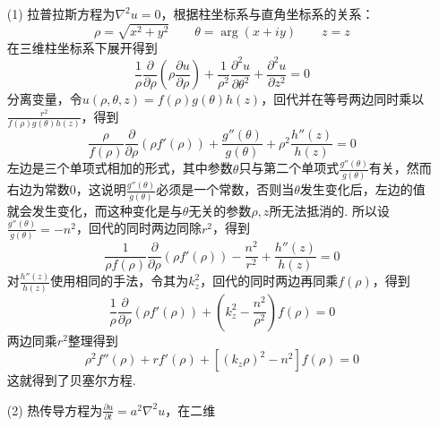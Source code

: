\documentclass[UTF8]{ctexart}
\begin{document}
\begin{itemize}
    \item[(1)] 拉普拉斯方程为\(\nabla^2 u =0\)，根据柱坐标系与直角坐标系的关系：
    \[\rho = \sqrt{x^2+y^2} \qquad \theta = \arg(x+iy) \qquad z = z\]
    在三维柱坐标系下展开得到
    \[\frac{1}{\rho}\frac{\partial}{\partial \rho}\left(\rho\frac{\partial u}{\partial \rho}\right) + \frac{1}{\rho^2}\frac{\partial^2 u}{\partial \theta^2} + \frac{\partial^2 u}{\partial z^2} = 0\]
    分离变量，令\(u(\rho,\theta,z)=f(\rho)g(\theta)h(z)\)，回代并在等号两边同时乘以\(\displaystyle{\frac{r^2}{f(\rho)g(\theta)h(z)}}\)，得到
    \[\frac{\rho}{f(\rho)}\frac{\partial}{\partial \rho}\left(\rho f'(\rho)\right) + \frac{g''(\theta)}{g(\theta)} + \rho^2\frac{h''(z)}{h(z)} = 0\]
    左边是三个单项式相加的形式，其中参数\(\theta\)只与第二个单项式\(\displaystyle{\frac{g''(\theta)}{g(\theta)}}\)有关，然而右边为常数\(0\)，这说明\(\displaystyle{\frac{g''(\theta)}{g(\theta)}}\)必须是一个常数，否则当\(\theta\)发生变化后，左边的值就会发生变化，而这种变化是与\(\theta\)无关的参数\(\rho,z\)所无法抵消的. 所以设\(\displaystyle{\frac{g''(\theta)}{g(\theta)}} = -n^2\)，回代的同时两边同除\(r^2\)，得到
    \[\frac{1}{\rho f(\rho)}\frac{\partial}{\partial \rho}\left(\rho f'(\rho)\right) -\frac{n^2}{r^2} + \frac{h''(z)}{h(z)} = 0\]
    对\(\displaystyle{\frac{h''(z)}{h(z)}}\)使用相同的手法，令其为\(k_z^2\)，回代的同时两边再同乘\(f(\rho)\)，得到
    \[\frac{1}{\rho}\frac{\partial}{\partial \rho}\left(\rho f'(\rho)\right) + \left(k_z^2-\frac{n^2}{\rho^2}\right)f(\rho) = 0\]
    两边同乘\(r^2\)整理得到
    \[\rho^2f''(\rho)+rf'(\rho)+[(k_z\rho)^2-n^2]f(\rho) = 0\]
    这就得到了贝塞尔方程.
    \item[(2)] 热传导方程为\(\displaystyle{\frac{\partial u}{\partial t} = a^2\nabla^2 u}\)，在二维
\end{itemize}
\end{document}

